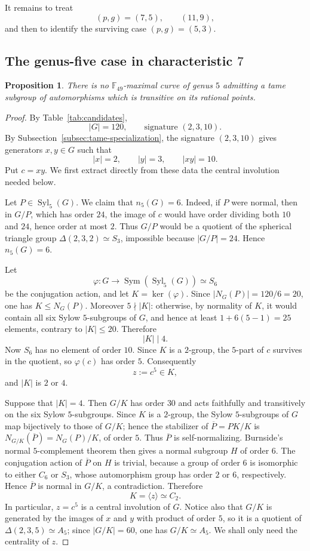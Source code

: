 \documentclass[11pt]{amsart}
\newtheorem{proposition}[theorem]{Proposition}
\theoremstyle{remark}
\newcommand{\F}{\mathbb F}
\newcommand{\Syl}{\operatorname{Syl}}
\begin{document}
It remains to treat
\[
(p,g)=(7,5),\qquad (11,9),
\]
and then to identify the surviving case $(p,g)=(5,3)$.


\subsection{\texorpdfstring{The genus-five case in characteristic $7$}
{The genus-five case in characteristic 7}}

\begin{proposition}\label{prop:seven}
There is no $\F_{49}$-maximal curve of genus $5$ admitting a tame
subgroup of automorphisms which is transitive on its rational points.
\end{proposition}

\begin{proof}
By Table~\ref{tab:candidates},
\[
|G|=120,
\qquad
\text{signature }(2,3,10).
\]
By Subsection~\ref{subsec:tame-specialization}, the signature
$(2,3,10)$ gives generators $x,y\in G$ such that
\[
|x|=2,\qquad |y|=3,\qquad |xy|=10.
\]
Put $c=xy$. We first extract directly from these data the central
involution needed below.

Let $P\in\Syl_5(G)$. We claim that $n_5(G)=6$. Indeed, if $P$ were
normal, then in $G/P$, which has order $24$, the image of $c$ would
have order dividing both $10$ and $24$, hence order at most $2$.
Thus $G/P$ would be a quotient of the spherical triangle group
$\Delta(2,3,2)\simeq S_3$, impossible because $|G/P|=24$.
Hence $n_5(G)=6$.

Let
\[
\varphi:G\longrightarrow \operatorname{Sym}(\Syl_5(G))\simeq S_6
\]
be the conjugation action, and let $K=\ker(\varphi)$. Since
$|N_G(P)|=120/6=20$, one has $K\le N_G(P)$. Moreover $5\nmid|K|$:
otherwise, by normality of $K$, it would contain all six Sylow
$5$-subgroups of $G$, and hence at least $1+6(5-1)=25$ elements,
contrary to $|K|\le20$. Therefore
\[
|K|\mid4.
\]
Now $S_6$ has no element of order $10$. Since $K$ is a $2$-group, the
$5$-part of $c$ survives in the quotient, so $\varphi(c)$ has order
$5$. Consequently
\[
z:=c^5\in K,
\]
and $|K|$ is $2$ or $4$.

Suppose that $|K|=4$. Then $G/K$ has order $30$ and acts faithfully and
transitively on the six Sylow $5$-subgroups. Since $K$ is a $2$-group,
the Sylow $5$-subgroups of $G$ map bijectively to those of $G/K$; hence
the stabilizer of $\overline P=PK/K$ is
$N_{G/K}(\overline P)=N_G(P)/K$, of order $5$. Thus $\overline P$ is
self-normalizing. Burnside's normal $5$-complement theorem then
gives a normal subgroup $H$ of order $6$. The conjugation action of
$\overline P$ on $H$ is trivial, because a group of order $6$ is
isomorphic to either $C_6$ or $S_3$, whose automorphism group has order
$2$ or $6$, respectively. Hence $\overline P$ is normal in $G/K$, a
contradiction. Therefore
\[
K=\langle z\rangle\simeq C_2.
\]
In particular, $z=c^5$ is a central involution of $G$. Notice also that
$G/K$ is generated by the images of $x$ and $y$ with product of order
$5$, so it is a quotient of $\Delta(2,3,5)\simeq A_5$; since
$|G/K|=60$, one has $G/K\simeq A_5$. We shall only need the centrality
of $z$.


\end{proof}
\end{document}
